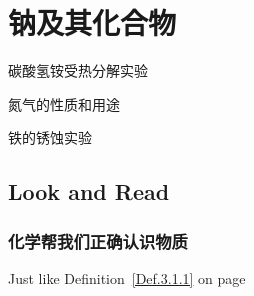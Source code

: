 \documentclass[color=blue]{textbook-cn}%
\begin{document}
\section{钠及其化合物}

\begin{Point*}
\lipsum[2]
\end{Point*}

\begin{Case*}
\item 碳酸氢铵受热分解实验
\item 氮气的性质和用途
\item 铁的锈蚀实验
\end{Case*}


\begin{Paracol}
\subsection{Look and Read}
\Example{\zhlipsum[1-2]\footnote{\lipsum[1][1-4]}}




\subsubsection{化学帮我们正确认识物质}

\lipsum[1-3]
\DeepThink*{\lipsum[1][1]}
\RelaInfo*{\lipsum[1][1]}
\Remark*{\lipsum[1][1]}

\begin{Definition}[定义名称]
\lipsum[1][1-5]
\end{Definition}

\lipsum[2]



\begin{Axiom}[公理名称公理名称公理名称公理名称公理名称]
\lipsum[1][1-4]
\end{Axiom}

\begin{Axiom*}[公理名称公理名称公理名称公理名称公理名称]
\lipsum[1][1-4]
\end{Axiom*}

Just like Definition~\ref{Def.3.1.1} on page \pageref{Def.3.1.1}

\DeepThink*{\lipsum[1][1]}
\RelaInfo*{\lipsum[1][1]}
\Remark*{\lipsum[1][1]}
\lipsum[2]



\begin{Corollary}
\lipsum[2][1-7]
\end{Corollary}





\end{Paracol}
\end{document}
